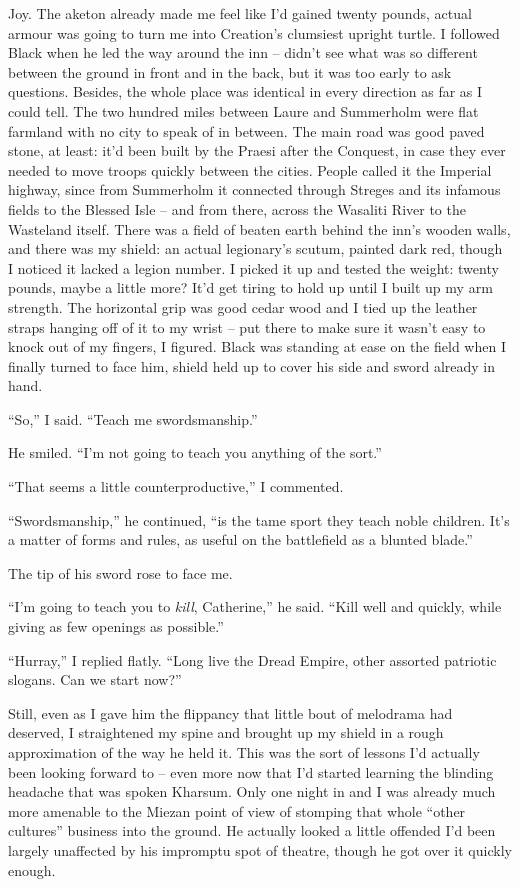 \documentclass[12pt, openany]{book}
\begin{document}
Joy. The aketon already made me feel like I’d gained twenty pounds, actual armour was going to turn me into Creation’s clumsiest upright turtle. I followed Black when he led the way around the inn – didn’t see what was so different between the ground in front and in the back, but it was too early to ask questions. Besides, the whole place was identical in every direction as far as I could tell. The two hundred miles between Laure and Summerholm were flat farmland with no city to speak of in between. The main road was good paved stone, at least: it’d been built by the Praesi after the Conquest, in case they ever needed to move troops quickly between the cities. People called it the Imperial highway, since from Summerholm it connected through Streges and its infamous fields to the Blessed Isle – and from there, across the Wasaliti River to the Wasteland itself. There was a field of beaten earth behind the inn’s wooden walls, and there was my shield: an actual legionary’s scutum, painted dark red, though I noticed it lacked a legion number. I picked it up and tested the weight: twenty pounds, maybe a little more? It’d get tiring to hold up until I built up my arm strength. The horizontal grip was good cedar wood and I tied up the leather straps hanging off of it to my wrist – put there to make sure it wasn’t easy to knock out of my fingers, I figured. Black was standing at ease on the field when I finally turned to face him, shield held up to cover his side and sword already in hand.

“So,” I said. “Teach me swordsmanship.”

He smiled. “I’m not going to teach you anything of the sort.”

“That seems a little counterproductive,” I commented.

“Swordsmanship,” he continued, “is the tame sport they teach noble children. It’s a matter of forms and rules, as useful on the battlefield as a blunted blade.”

The tip of his sword rose to face me.

“I’m going to teach you to \textit{kill}, Catherine,” he said. “Kill well and quickly, while giving as few openings as possible.”

“Hurray,” I replied flatly. “Long live the Dread Empire, other assorted patriotic slogans. Can we start now?”

Still, even as I gave him the flippancy that little bout of melodrama had deserved, I straightened my spine and brought up my shield in a rough approximation of the way he held it. This was the sort of lessons I’d actually been looking forward to – even more now that I’d started learning the blinding headache that was spoken Kharsum. Only one night in and I was already much more amenable to the Miezan point of view of stomping that whole “other cultures” business into the ground. He actually looked a little offended I’d been largely unaffected by his impromptu spot of theatre, though he got over it quickly enough.
\end{document}
